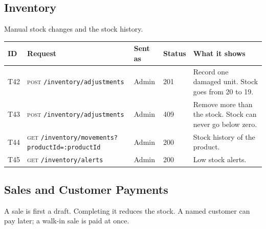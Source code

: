 \documentclass[11pt,a4paper]{article}
\newcommand{\code}[1]{\texttt{#1}}
\begin{document}
\subsection{Inventory}
Manual stock changes and the stock history.

\begin{longtable}{@{}P{0.7cm}P{5.0cm}P{1.3cm}P{1.15cm}P{5.75cm}@{}}
\toprule
\textbf{ID} & \textbf{Request} & \textbf{Sent as} & \textbf{Status} & \textbf{What it shows} \\
\midrule
\endhead
T42 & \textsc{post} \code{/\allowbreak{}inventory/\allowbreak{}adjustments} & Admin & 201 & Record one damaged unit. Stock goes from 20 to 19. \\
T43 & \textsc{post} \code{/\allowbreak{}inventory/\allowbreak{}adjustments} & Admin & 409 & Remove more than the stock. Stock can never go below zero. \\
T44 & \textsc{get} \code{/\allowbreak{}inventory/\allowbreak{}movements?\allowbreak{}productId=\allowbreak{}:productId} & Admin & 200 & Stock history of the product. \\
T45 & \textsc{get} \code{/\allowbreak{}inventory/\allowbreak{}alerts} & Admin & 200 & Low stock alerts. \\
\bottomrule
\end{longtable}

\subsection{Sales and Customer Payments}
A sale is first a draft. Completing it reduces the stock. A named customer can pay later; a walk-in sale is paid at once.
\end{document}

